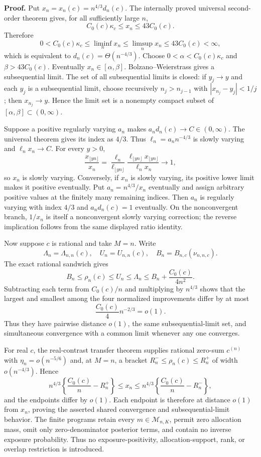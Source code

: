 \textbf{Proof.}
Put \(x_n=x_n(c)=n^{4/3}d_n(c)\). The internally proved universal second-order theorem gives, for all sufficiently large \(n\),
\[
 C_0(c)\kappa_c\leq x_n\leq43C_0(c).
\]
Therefore
\[
 0<C_0(c)\kappa_c
 \leq\liminf_nx_n\leq\limsup_nx_n\leq43C_0(c)<\infty,
\]
which is equivalent to \(d_n(c)=\Theta(n^{-4/3})\). Choose \(0<\alpha<C_0(c)\kappa_c\) and \(\beta>43C_0(c)\). Eventually \(x_n\in[\alpha,\beta]\). Bolzano--Weierstrass gives a subsequential limit. The set of all subsequential limits is closed: if \(y_j\to y\) and each \(y_j\) is a subsequential limit, choose recursively \(n_j>n_{j-1}\) with \(|x_{n_j}-y_j|<1/j\); then \(x_{n_j}\to y\). Hence the limit set is a nonempty compact subset of \([\alpha,\beta]\subset(0,\infty)\).

Suppose a positive regularly varying \(a_n\) makes \(a_nd_n(c)\to C\in(0,\infty)\). The universal theorem gives its index as \(4/3\). Thus \(\ell_n=a_nn^{-4/3}\) is slowly varying and \(\ell_nx_n\to C\). For every \(y>0\),
\[
 \frac{x_{\lfloor yn\rfloor}}{x_n}
 =\frac{\ell_n}{\ell_{\lfloor yn\rfloor}}
 \frac{\ell_{\lfloor yn\rfloor}x_{\lfloor yn\rfloor}}{\ell_nx_n}
 \longrightarrow1,
\]
so \(x_n\) is slowly varying. Conversely, if \(x_n\) is slowly varying, its positive lower limit makes it positive eventually. Put \(a_n=n^{4/3}/x_n\) eventually and assign arbitrary positive values at the finitely many remaining indices. Then \(a_n\) is regularly varying with index \(4/3\) and \(a_nd_n(c)=1\) eventually. On the nonconvergent branch, \(1/x_n\) is itself a nonconvergent slowly varying correction; the reverse implication follows from the same displayed ratio identity.

Now suppose \(c\) is rational and take \(M=n\). Write
\[
 \Lambda_n=\Lambda_{n,n}(c),\quad U_n=U_{n,n}(c),\quad
 B_n=B_{n,c}(\nu_{n,n,c}).
\]
The exact rational sandwich gives
\[
 B_n\leq\rho_n(c)\leq U_n\leq\Lambda_n
 \leq B_n+\frac{C_0(c)}{4n^2}.
\]
Subtracting each term from \(C_0(c)/n\) and multiplying by \(n^{4/3}\) shows that the largest and smallest among the four normalized improvements differ by at most
\[
 \frac{C_0(c)}4n^{-2/3}=o(1).
\]
Thus they have pairwise distance \(o(1)\), the same subsequential-limit set, and simultaneous convergence with a common limit whenever any one converges.

For real \(c\), the real-contrast transfer theorem supplies rational zero-sum \(c^{(n)}\) with \(\eta_n=o(n^{-5/6})\) and, at \(M=n\), a bracket \(R_n^-\leq\rho_n(c)\leq R_n^+\) of width \(o(n^{-4/3})\). Hence
\[
 n^{4/3}\left\{\frac{C_0(c)}n-R_n^+\right\}
 \leq x_n\leq
 n^{4/3}\left\{\frac{C_0(c)}n-R_n^-\right\},
\]
and the endpoints differ by \(o(1)\). Each endpoint is therefore at distance \(o(1)\) from \(x_n\), proving the asserted shared convergence and subsequential-limit behavior. The finite programs retain every \(m\in\mathcal M_{n,K}\), permit zero allocation mass, omit only zero-denominator posterior terms, and contain no inverse exposure probability. Thus no exposure-positivity, allocation-support, rank, or overlap restriction is introduced.

